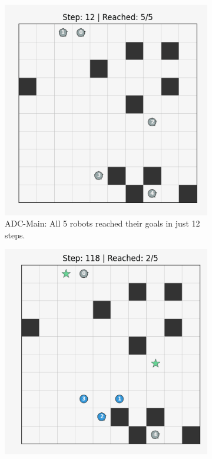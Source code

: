 \begin{figure}[htbp]
\begin{subfigure}[b]{0.32\textwidth}
        \includegraphics[width=\textwidth]{images/case_study_adc_success.png} %
        \caption{ADC-Main: All 5 robots reached their goals in just 12 steps.}
        \label{fig:cs_adc_success}
    \end{subfigure}
    \hfill %
    \begin{subfigure}[b]{0.32\textwidth}
        \centering
        \includegraphics[width=\textwidth]{images/case_study_gcn_deadlock.png} %

\end{subfigure}
\end{figure}
